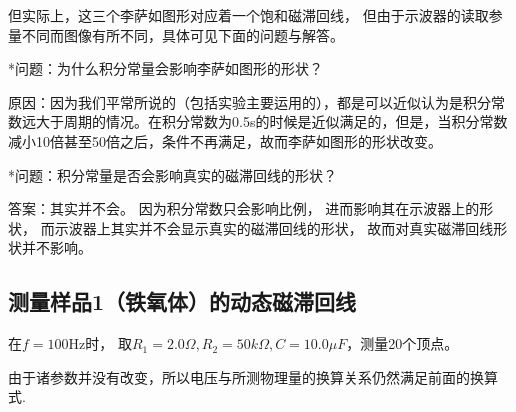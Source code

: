 \documentclass[11pt]{article}
\begin{document}
但实际上，这三个李萨如图形对应着一个饱和磁滞回线，
但由于示波器的读取参量不同而图像有所不同，具体可见下面的问题与解答。

*问题：为什么积分常量会影响李萨如图形的形状？

原因：因为我们平常所说的（包括实验主要运用的），都是可以近似认为是积分常数远大于周期的情况。在积分常数为0.5s的时候是近似满足的，但是，当积分常数减小10倍甚至50倍之后，条件不再满足，故而李萨如图形的形状改变。

*问题：积分常量是否会影响真实的磁滞回线的形状？

答案：其实并不会。
因为积分常数只会影响比例，
进而影响其在示波器上的形状，
而示波器上其实并不会显示真实的磁滞回线的形状，
故而对真实磁滞回线形状并不影响。




\subsection{测量样品1（铁氧体）的动态磁滞回线}

在$f=100\text{Hz}$时，
取$R_1=2.0\Omega,R_2=50k\Omega,C=10.0\mu F$，测量20个顶点。

由于诸参数并没有改变，所以电压与所测物理量的换算关系仍然满足前面的换算式.
\end{document}
